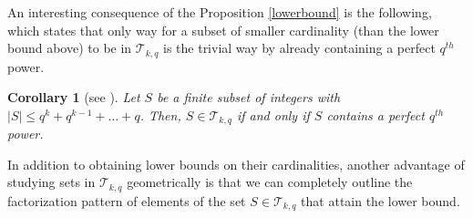 \documentclass[12pt]{amsart}
\newtheorem{corollary}[theorem]{Corollary}
\newtheorem{example}[theorem]{Example}
\newcommand{\F}{{\mathbb F}}
\newcommand{\fq}{{\mathbb F}_{q}}
\newcommand{\PG}{\mathrm{PG}}
\begin{document}
An interesting consequence of the Proposition \ref{lowerbound} is the following, which states that only way for a subset of smaller cardinality (than the lower bound above) to be in $\mathcal{T}_{k,q}$ is the trivial way by already containing a perfect $q^{th}$ power. 

\begin{corollary} [see \textnormal{\cite[Theorem 5]{skalba2004alternatives}}]
Let $S$ be a finite subset of integers with $|S| \leq q^{k} + q^{k-1} + \ldots + q$. Then, $S \in\mathcal{T}_{k,q}$ if and only if $S$ contains a perfect $q^{th}$ power. 
\end{corollary}

In addition to obtaining lower bounds on their cardinalities, another advantage of studying sets in $\mathcal{T}_{k, q}$ geometrically is that we can completely outline the factorization pattern of elements of the set $S \in\mathcal{T}_{k,q}$ that attain the lower bound. 
\end{document}
